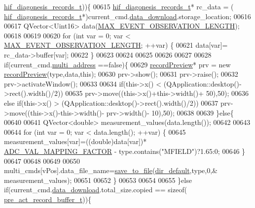 \begin{DoxyCode}
      \hyperlink{a00003_a4726b814166e222a6f13e21453f76d8d}{hif\_diagonesis\_records\_t}))\{
00615         \hyperlink{a00003_a4726b814166e222a6f13e21453f76d8d}{hif\_diagonesis\_records\_t}* rc\_data = (
      \hyperlink{a00003_a4726b814166e222a6f13e21453f76d8d}{hif\_diagonesis\_records\_t}*)current\_cmd.\hyperlink{a00001_a5cfeaed4d4f8e51070a324c0ba893ebe}{data\_download}.storage\_location;
00616 
00617         QVector<Uint16> data(\hyperlink{a00003_aa060aeb1ecb530b3c6f6d91060999b70}{MAX\_EVENT\_OBSERVATION\_LENGTH});
00618 
00619 
00620         \textcolor{keywordflow}{for} (\textcolor{keywordtype}{int} var = 0; var < \hyperlink{a00003_aa060aeb1ecb530b3c6f6d91060999b70}{MAX\_EVENT\_OBSERVATION\_LENGTH}; ++var) \{
00621             data[var]= rc\_data->buffer[var];
00622         \}
00623 
00624 
00625 
00626 
00627 
00628         \textcolor{keywordflow}{if}(current\_cmd.\hyperlink{a00001_a8e69b971c61ced27a7567efd2bf0db59}{multi\_address} ==\textcolor{keyword}{false})\{
00629         \hyperlink{a00020}{recordPreview}* prv = \textcolor{keyword}{new} \hyperlink{a00020}{recordPreview}(type,data,\textcolor{keyword}{this});
00630         prv->show();
00631         prv->raise();
00632         prv->activateWindow();
00633 
00634         \textcolor{keywordflow}{if}(this->x() < (QApplication::desktop()->rect().width()/2))
00635         prv->move((this->x()+this->width()+ 50),50);
00636         \textcolor{keywordflow}{else} \textcolor{keywordflow}{if}(this->x() > (QApplication::desktop()->rect().width()/2))
00637         prv->move((this->x()-this->width()- prv->width()- 10),50);
00638 
00639         \}\textcolor{keywordflow}{else}\{
00640 
00641             QVector<double> measurement\_values(data.length());
00642 
00643 
00644             \textcolor{keywordflow}{for} (\textcolor{keywordtype}{int} var = 0; var < data.length(); ++var) \{
00645                 measurement\_values[var]=((double)data[var])*
      \hyperlink{a00031_ada92d3eeeec0cbeee41e76a52d145792}{ADC\_VAL\_MAPPING\_FACTOR} - type.contains(\textcolor{stringliteral}{"MFIELD"})?1.65:0;
00646             \}
00647 
00648 
00649 
00650             multi\_cmds[vPos].data\_file\_name=\hyperlink{a00006_a0114355b9f626345cf77d6f714f51468}{save\_to\_file}(\hyperlink{a00006_a2e107e43aeaccaf4c9a42254f13122c8}{dir\_default},type,0,&
      measurement\_values);
00651 
00652         \}
00653 
00654 
00655     \}\textcolor{keywordflow}{else} \textcolor{keywordflow}{if}(current\_cmd.\hyperlink{a00001_a5cfeaed4d4f8e51070a324c0ba893ebe}{data\_download}.total\_size.copied == \textcolor{keyword}{sizeof}(
      \hyperlink{a00003_d4/d7d/a00093}{pre\_act\_record\_buffer\_t}))\{

\end{DoxyCode}
